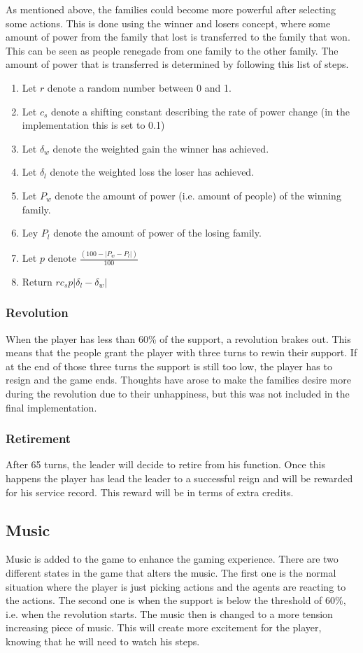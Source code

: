 \documentclass[11pt,a4paper]{article}
\begin{document}
As mentioned above, the families could become more powerful after selecting some actions. This is done using the winner and losers concept, where some amount of power from the  family that lost is transferred to the family that won. This can be seen as people renegade from one family to the other family. The amount of power that is transferred is determined by following this list of steps.
\begin{enumerate}
  \item Let $r$ denote a random number between 0 and 1.
  \item Let $c_s$ denote a shifting constant describing the rate of power change (in the implementation this is set to 0.1)
  \item Let $\delta_w$ denote the weighted gain the winner has achieved.
  \item Let $\delta_l$ denote the weighted loss the loser has achieved.
  \item Let $P_w$ denote the amount of power (i.e. amount of people) of the winning family.
  \item Ley $P_l$ denote the amount of power of the losing family.
  \item Let $p$ denote $\frac{(100 - \lvert P_w - P_l \rvert)}{100}$
  \item Return $r c_s p \lvert \delta_l - \delta_w \rvert$
\end{enumerate}

\subsubsection{Revolution}
When the player has less than 60\% of the support, a revolution brakes out. This means that the people grant the player with three turns to rewin their support. If at the end of those three turns the support is still too low, the player has to resign and the game ends. Thoughts have arose to make the families desire more during the revolution due to their unhappiness, but this was not included in the final implementation.

\subsubsection{Retirement}
After 65 turns, the leader will decide to retire from his function. Once this happens the player has lead the leader to a successful reign and will be rewarded for his service record. This reward will be in terms of extra credits. 

\subsection{Music}
Music is added to the game to enhance the gaming experience. There are two different states in the game that alters the music. The first one is the normal situation where the player is just picking actions and the agents are reacting to the actions. The second one is when the support is below the threshold of 60\%, i.e. when the revolution starts. The music then is changed to a more tension increasing piece of music. This will create more excitement for the player, knowing that he will need to watch his steps. 
\end{document}
